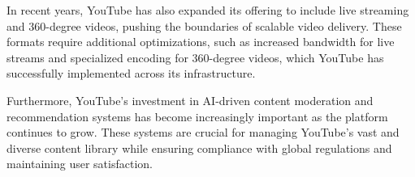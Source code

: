 In recent years, YouTube has also expanded its offering to include live streaming and 360-degree videos, pushing the boundaries of scalable video delivery. These formats require additional optimizations, such as increased bandwidth for live streams and specialized encoding for 360-degree videos, which YouTube has successfully implemented across its infrastructure\cite{youtube_live}.

Furthermore, YouTube's investment in AI-driven content moderation and recommendation systems has become increasingly important as the platform continues to grow. These systems are crucial for managing YouTube's vast and diverse content library while ensuring compliance with global regulations and maintaining user satisfaction\cite{youtube_ai}.

